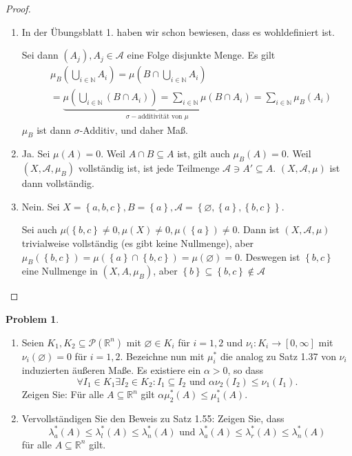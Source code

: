 \documentclass[prb,12pt]{revtex4-2}
\theoremstyle{definition}
\newtheorem{Problem}{Problem}
\theoremstyle{definition}
\newenvironment{parts}{\begin{enumerate}[label=(\alph*)]}{\end{enumerate}}
\newcommand{\N}{\mathbb{N}}
\newcommand{\R}{\mathbb{R}}
\begin{document}
\begin{proof}
	\begin{parts}
	\item In der Übungsblatt 1. haben wir schon bewiesen, dass es wohldefiniert ist.

		Sei dann $(A_j), A_j\in \mathcal{A}$ eine Folge disjunkte Menge. Es gilt
	\begin{align*}
		&\mu_B\left( \bigcup_{i\in\N} A_i \right) =\mu\left( B\cap \bigcup_{i\in \N} A_i \right)\\
		&=\underbrace{\mu\left( \bigcup_{i\in \N} \left( B \cap A_i \right)  \right)=\sum_{i\in \N}\mu(B\cap A_i)}_{\sigma-\text{additivität von }\mu}=\sum_{i\in \N}\mu_B(A_i)
	\end{align*}
		$\mu_B$ ist dann $\sigma$-Additiv, und daher Maß.
	\item Ja. Sei $\mu(A)=0$. Weil $A\cap B\subseteq A$ ist, gilt auch $\mu_B(A)=0$. Weil $(X,\mathcal{A},\mu_B)$ vollständig ist, ist jede Teilmenge $\mathcal{A}\ni A' \subseteq A$. $(X, \mathcal{A},\mu)$ ist dann vollständig.
	\item Nein. Sei $X=\left\{ a,b,c \right\},B=\left\{ a \right\}, \mathcal{A}=\left\{\varnothing, \left\{ a \right\} , \left\{ b,c \right\}  \right\} $.

		Sei auch $\mu(\left\{ b,c \right\} \neq 0, \mu(X)\neq 0, \mu(\left\{ a \right\} )\neq 0$. Dann ist $(X, \mathcal{A},\mu)$ trivialweise vollständig (es gibt keine Nullmenge), aber $\mu_B(\left\{ b,c \right\} )=\mu(\left\{ a \right\} \cap \left\{ b,c \right\} )=\mu(\varnothing)=0$. Deswegen ist $\left\{ b,c \right\} $ eine Nullmenge in $(X,A,\mu_B)$, aber $\left\{ b \right\} \subseteq \left\{b ,c \right\} \not\in \mathcal{A}$
	\end{parts}
\end{proof}
\begin{Problem}
	\begin{parts}
\item	Seien $K_1 , K_2 \subseteq \mathcal{P}(\R^n)$ mit $\varnothing \in K_i$ für $i = 1, 2$ und $\nu_i : K_i \to [0, \infty]$ mit $\nu_i (\varnothing) = 0$ für $i = 1, 2$. Bezeichne nun mit $\mu^*_i$ die analog zu Satz 1.37 von $\nu_i$ induzierten äußeren Maße. Es existiere ein $\alpha > 0$, so dass
	\[
		\forall I_1\in K_1\exists I_2\in K_2: I_1\subseteq I_2\text{ und }\alpha \nu_2(I_2)\le \nu_1(I_1)
	.\] 
	Zeigen Sie: F\"{u}r alle $A\subseteq \R^n$ gilt $\alpha\mu_2^*(A)\le \mu_1^*(A)$.
\item Vervollständigen Sie den Beweis zu Satz 1.55: Zeigen Sie, dass
	\[
		\lambda_a^*(A)\le \lambda_l^*(A)\le \lambda_n^*(A)\text{ und }\lambda_a^*(A)\le \lambda_r^* (A)\le \lambda_n^*(A)\]
		f\"{u}r alle $A\subseteq \R^n$ gilt.
	\end{parts}
\end{Problem}
\end{document}
